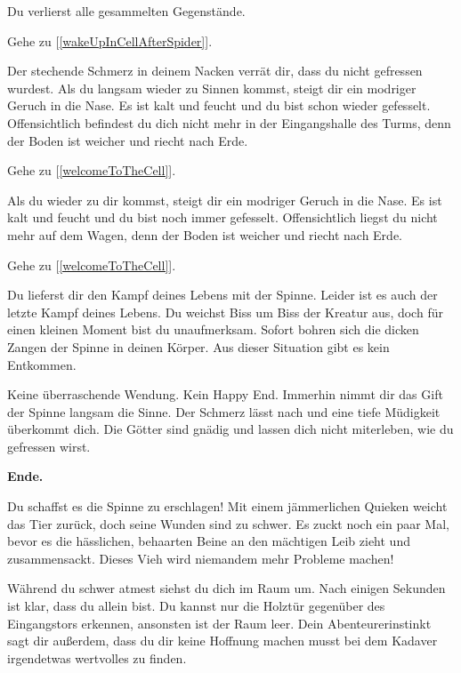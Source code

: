 Du verlierst alle gesammelten Gegenstände.

Gehe zu [\ref{wakeUpInCellAfterSpider}].


Der stechende Schmerz in deinem Nacken verrät dir, dass du nicht gefressen wurdest. Als du langsam wieder zu Sinnen kommst, steigt dir ein modriger Geruch in die Nase. Es ist kalt und feucht und du bist schon wieder gefesselt. Offensichtlich befindest du dich nicht mehr in der Eingangshalle des Turms, denn der Boden ist weicher und riecht nach Erde.

Gehe zu [\ref{welcomeToTheCell}].


Als du wieder zu dir kommst, steigt dir ein modriger Geruch in die Nase. Es ist kalt und feucht und du bist noch immer gefesselt. Offensichtlich liegst du nicht mehr auf dem Wagen, denn der Boden ist weicher und riecht nach Erde.

Gehe zu [\ref{welcomeToTheCell}].


Du lieferst dir den Kampf deines Lebens mit der Spinne. Leider ist es auch der letzte Kampf deines Lebens. Du weichst Biss um Biss der Kreatur aus, doch für einen kleinen Moment bist du unaufmerksam. Sofort bohren sich die dicken Zangen der Spinne in deinen Körper. Aus dieser Situation gibt es kein Entkommen.

Keine überraschende Wendung. Kein Happy End. Immerhin nimmt dir das Gift der Spinne langsam die Sinne. Der Schmerz lässt nach und eine tiefe Müdigkeit überkommt dich. Die Götter sind gnädig und lassen dich nicht miterleben, wie du gefressen wirst.

\textbf{Ende.}


Du schaffst es die Spinne zu erschlagen! Mit einem jämmerlichen Quieken weicht das Tier zurück, doch seine Wunden sind zu schwer. Es zuckt noch ein paar Mal, bevor es die hässlichen, behaarten Beine an den mächtigen Leib zieht und zusammensackt. Dieses Vieh wird niemandem mehr Probleme machen!

Während du schwer atmest siehst du dich im Raum um. Nach einigen Sekunden ist klar, dass du allein bist. Du kannst nur die Holztür gegenüber des Eingangstors erkennen, ansonsten ist der Raum leer. Dein Abenteurerinstinkt sagt dir außerdem, dass du dir keine Hoffnung machen musst bei dem Kadaver irgendetwas wertvolles zu finden.


